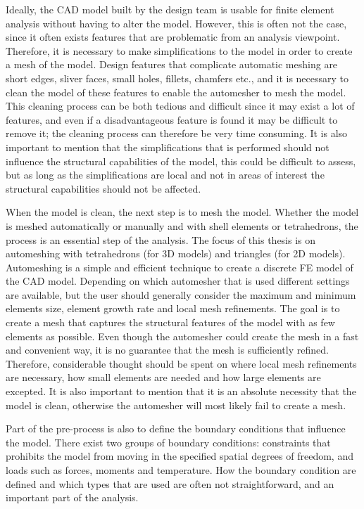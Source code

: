 Ideally, the CAD model built by the design team is usable for finite element analysis without having to alter the model. However, this is often not the case, since it often exists features that are problematic from an analysis viewpoint. Therefore, it is necessary to make simplifications to the model in order to create a mesh of the model. Design features that complicate automatic meshing are short edges, sliver faces, small holes, fillets, chamfers etc., and it is necessary to clean the model of these features to enable the automesher to mesh the model. This cleaning process can be both tedious and difficult since it may exist a lot of features, and even if a disadvantageous feature is found it may be difficult to remove it; the cleaning process can therefore be very time consuming. It is also important to mention that the simplifications that is performed should not influence the structural capabilities of the model, this could be difficult to assess, but as long as the simplifications are local and not in areas of interest the structural capabilities should not be affected.~\cite[p.~181--191]{adams99}

When the model is clean, the next step is to mesh the model. Whether the model is meshed automatically or manually and with shell elements or tetrahedrons, the process is an essential step of the analysis. The focus of this thesis is on automeshing with tetrahedrons (for 3D models) and triangles (for 2D models). Automeshing is a simple and efficient technique to create a discrete FE model of the CAD model. Depending on which automesher that is used different settings are available, but the user should generally consider the maximum and minimum elements size, element growth rate and local mesh refinements. The goal is to create a mesh that captures the structural features of the model with as few elements as possible. Even though the automesher could create the mesh in a fast and convenient way, it is no guarantee that the mesh is sufficiently refined. Therefore, considerable thought should be spent on where local mesh refinements are necessary, how small elements are needed and how large elements are excepted. It is also important to mention that it is an absolute necessity that the model is clean, otherwise the automesher will most likely fail to create a mesh.~\cite[p.~251-255]{adams99}

Part of the pre-process is also to define the boundary conditions that influence the model. There exist two groups of boundary conditions: constraints that prohibits the model from moving in the specified spatial degrees of freedom, and loads such as forces, moments and temperature. How the boundary condition are defined and which types that are used are often not straightforward, and an important part of the analysis.~\cite[p.~263]{adams99}

